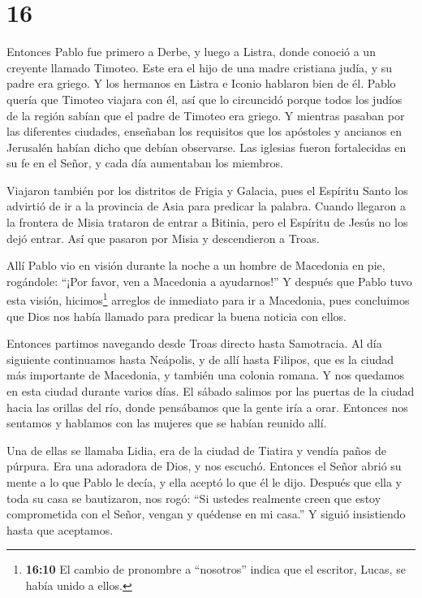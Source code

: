 \hypertarget{section-15}{%
\section{16}\label{section-15}}

 Entonces Pablo fue primero a Derbe, y luego a Listra, donde
conoció a un creyente llamado Timoteo. Este era el hijo de una madre
cristiana judía, y su padre era griego.  Y los hermanos en
Listra e Iconio hablaron bien de él.  Pablo quería que
Timoteo viajara con él, así que lo circuncidó porque todos los judíos de
la región sabían que el padre de Timoteo era griego.  Y
mientras pasaban por las diferentes ciudades, enseñaban los requisitos
que los apóstoles y ancianos en Jerusalén habían dicho que debían
observarse.  Las iglesias fueron fortalecidas en su fe en el
Señor, y cada día aumentaban los miembros.

 Viajaron también por los distritos de Frigia y Galacia,
pues el Espíritu Santo los advirtió de ir a la provincia de Asia para
predicar la palabra.  Cuando llegaron a la frontera de Misia
trataron de entrar a Bitinia, pero el Espíritu de Jesús no los dejó
entrar.  Así que pasaron por Misia y descendieron a Troas.

 Allí Pablo vio en visión durante la noche a un hombre de
Macedonia en pie, rogándole: ``¡Por favor, ven a Macedonia a
ayudarnos!''  Y después que Pablo tuvo esta visión,
hicimos\footnote{\textbf{16:10} El cambio de pronombre a ``nosotros''
  indica que el escritor, Lucas, se había unido a ellos.} arreglos de
inmediato para ir a Macedonia, pues concluimos que Dios nos había
llamado para predicar la buena noticia con ellos.

 Entonces partimos navegando desde Troas directo hasta
Samotracia. Al día siguiente continuamos hasta Neápolis,  y
de allí hasta Filipos, que es la ciudad más importante de Macedonia, y
también una colonia romana. Y nos quedamos en esta ciudad durante varios
días.  El sábado salimos por las puertas de la ciudad hacia
las orillas del río, donde pensábamos que la gente iría a orar. Entonces
nos sentamos y hablamos con las mujeres que se habían reunido allí.

 Una de ellas se llamaba Lidia, era de la ciudad de Tiatira
y vendía paños de púrpura. Era una adoradora de Dios, y nos escuchó.
Entonces el Señor abrió su mente a lo que Pablo le decía, y ella aceptó
lo que él le dijo.  Después que ella y toda su casa se
bautizaron, nos rogó: ``Si ustedes realmente creen que estoy
comprometida con el Señor, vengan y quédense en mi casa.'' Y siguió
insistiendo hasta que aceptamos.

